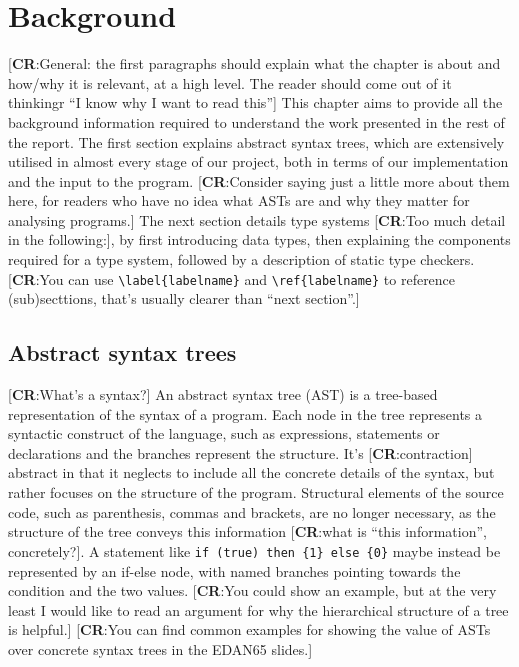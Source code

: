 \documentclass[nofilelist]{cslthse-msc}
\newcommand{\CR}[1]{\textcolor{green!60!black}{[\textbf{CR}:#1]}}
\begin{document}
\chapter{Background}
\CR{General: the first paragraphs should explain what the chapter is about and how/why it is relevant, at a high level.  The reader should come out of it thinkingr ``I know why I want to read this''}
This chapter aims to provide all the background information required to understand the work presented in the rest of the report.
The first section explains abstract syntax trees, which are extensively utilised in almost every stage of our project, both in terms of our implementation and the input to the program.
\CR{Consider saying just a little more about them here, for readers who have no idea what ASTs are and why they matter for
    analysing programs.}
The next section details type systems \CR{Too much detail in the following:}, by first introducing data types, then explaining the components required for a type system, followed by a description of static type checkers.
\CR{You can use \texttt{\textbackslash label\{labelname\}} and \texttt{\textbackslash ref\{labelname\}} to reference (sub)secttions, that's usually clearer than ``next section''.}

\section{Abstract syntax trees}
\CR{What's a syntax?}
An abstract syntax tree (AST) is a tree-based representation of the syntax of a program.
Each node in the tree represents a syntactic construct of the language, such as expressions, statements or declarations and the branches represent the structure.
It's \CR{contraction} abstract in that it neglects to include all the concrete details of the syntax, but rather focuses on the structure of the program.
Structural elements of the source code, such as parenthesis, commas and brackets, are no longer necessary, as the structure of the tree conveys this information \CR{what is ``this information'', concretely?}.
A statement like \verb|if (true) then {1} else {0}| maybe instead be represented by an if-else node, with named branches pointing towards the condition and the two values.
\CR{You could show an example, but at the very least I would like to read an argument for why the hierarchical structure of a tree is helpful.}
\CR{You can find common examples for showing the value of ASTs over concrete syntax trees in the EDAN65 slides.}
\end{document}
